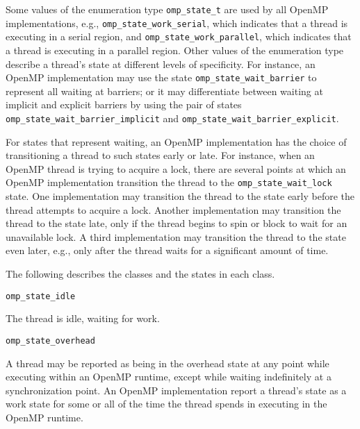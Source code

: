 Some values of the enumeration type \verb|omp_state_t| are used by all 
OpenMP implementations, 
e.g., \verb|omp_state_work_serial|, 
which indicates that a thread is executing in a serial region, and  
\verb|omp_state_work_parallel|, 
which indicates that a thread is executing in a parallel region.
Other values of the enumeration type describe a thread's state at 
different levels of specificity. 
For instance, an OpenMP implementation may use 
the state \verb|omp_state_wait_barrier|  to represent all 
waiting at barriers; or it may differentiate between waiting at 
implicit and explicit barriers by using the pair of states
\verb|omp_state_wait_barrier_implicit| and 
\verb|omp_state_wait_barrier_explicit|. 

For states that represent waiting, an OpenMP implementation has the 
choice of transitioning a thread to such states early or late.
For instance, when an OpenMP thread is trying to acquire a lock,
there are several points at which an OpenMP implementation
transition the thread to the \verb|omp_state_wait_lock| state.
One implementation may transition the thread to the state 
early before the thread attempts to acquire a
lock. Another implementation may transition the thread to the state 
late, only if the thread begins to spin or
block to wait for an unavailable lock. A third implementation
may transition the thread to the state even later, e.g., only
after the thread waits for a significant amount of time. 

The following describes the classes and the states in each class.



\begin{description}
\item \verb|omp_state_idle| 

  The thread is idle, waiting for work.

\end{description}


\begin{description}
\item \verb|omp_state_overhead| 

  A thread may be reported as being in the overhead state at any point while 
  executing within an OpenMP runtime, except while waiting indefinitely
  at a synchronization point.
  An OpenMP implementation report a thread's state as a work state for
  some or all of the time the thread spends in executing in the OpenMP runtime.
\end{description}

